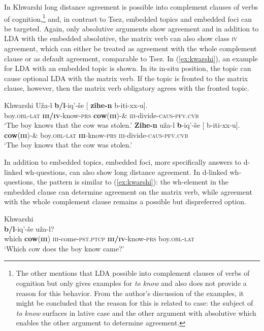 \documentclass[output=paper
,modfonts
,nonflat]{langsci/langscibook}
\begin{document}
In Khwarshi \citep{Khalilova2008,Khalilova2009} long distance agreement is possible into complement clauses of verbs of cognition,\footnote{The other mentions that LDA possible into complement clauses of verbs of cognition but only gives examples for \textit{to know} and also does not provide a reason for this behavior. From the author's discussion of the examples, it might be concluded that the reason for this is related to case: the subject of \textit{to know} surfaces in lative case and the other argument with absolutive which enables the other argument to determine agreement.} and, in contrast to Tsez, embedded topics and embedded foci can be targeted. Again, only absolutive arguments show agreement and in addition to LDA with the embedded absolutive, the matrix verb can also show class \textsc{iv} agreement, which can either be treated as agreement with the whole complement clause or as default agreement, comparable to Tsez. In (\ref{ex:kwarshi}), an example for LDA with an embedded topic is shown. In its in-situ position, the topic can cause optional LDA with the matrix verb. If the topic is fronted to the matrix clause, however, then the matrix verb obligatory agrees with the fronted topic.
\begin{exe}
\ex Khwarshi  \citep[][118]{Khalilova2008}\label{ex:kwarshi}
	\xlist
	\ex
		\gll U\v{z}a-l \textbf{b/l}-iq'-\v{s}e [ \textbf{zihe-n} b-iti-xx-u].\\
			 boy.\textsc{obl-lat}  \textbf{\textsc{iii/iv}}-know-\textsc{prs} {} \textbf{cow}(\textbf{\textsc{iii}})-\& \textsc{iii}-divide-\textsc{caus}-\textsc{pfv.cvb}\\
		\glt `The boy knows that the cow was stolen.'
	\ex
		\gll \textbf{Zihe-n} u\v{z}a-l \textbf{b}-iq'-\v{s}e [ b-iti-xx-u].\\
			 \textbf{cow}(\textbf{\textsc{iii}})-\& boy.\textsc{obl-lat} \textbf{\textsc{iii}}-know-\textsc{prs} {} \textsc{iii}-divide-\textsc{caus}-\textsc{pfv.cvb}\\
		\glt `The boy knows that the cow was stolen.'
	\endxlist
\end{exe}
In addition to embedded topics, embedded foci, more specifically answers to d-linked wh-questions, can also show long distance agreement. In d-linked wh-questions, the pattern is similar to (\ref{ex:kwarshi}): the wh-element in the embedded clause can determine agreement on the matrix verb, while agreement with the whole complement clause remains a possible but dispreferred option. 
\begin{exe}
\ex Khwarshi  \citep[][390]{Khalilova2008}\\
	 \textbf{b/l}-iq'-\v{s}e u\v{z}a-l?\\
		 {} which \textbf{cow}(\textbf{\textsc{iii}}) \textsc{iii}-come-\textsc{pst.ptcp} {} \textbf{\textsc{iii/iv}}-know-\textsc{prs} boy.\textsc{obl-lat}\\
	\glt `Which cow does the boy know came?'
\end{exe}
\end{document}
